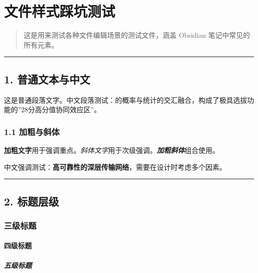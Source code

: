 \section{文件样式踩坑测试}\label{ux6587ux4ef6ux6837ux5f0fux8e29ux5751ux6d4bux8bd5}

\begin{quote}
这是用来测试各种文件编辑场景的测试文件，涵盖 Obsidian
笔记中常见的所有元素。
\end{quote}

\begin{center}\rule{0.5\linewidth}{0.5pt}\end{center}

\subsection{1.
普通文本与中文}\label{ux666eux901aux6587ux672cux4e0eux4e2dux6587}

这是普通段落文字。中文段落测试：的概率与统计的交汇融合，构成了极具选拔功能的''28分高分值协同效应区''。

\subsubsection{1.1 加粗与斜体}\label{ux52a0ux7c97ux4e0eux659cux4f53}

\textbf{加粗文字}用于强调重点。\emph{斜体文字}用于次级强调。\textbf{\emph{加粗斜体}}组合使用。

中文强调测试：\textbf{高可靠性的深层传输网络}，需要在设计时考虑多个因素。

\begin{center}\rule{0.5\linewidth}{0.5pt}\end{center}

\subsection{2. 标题层级}\label{ux6807ux9898ux5c42ux7ea7}

\subsubsection{三级标题}\label{ux4e09ux7ea7ux6807ux9898}

\paragraph{四级标题}\label{ux56dbux7ea7ux6807ux9898}

\subparagraph{五级标题}\label{ux4e94ux7ea7ux6807ux9898}

